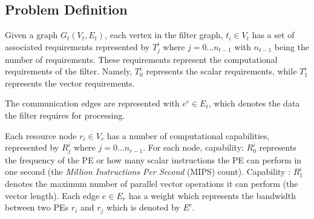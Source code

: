 \documentclass[10pt, conference, compsocconf, reqno]{IEEEtran}
\begin{document}
\subsection{Problem Definition}

Given a graph $G_t(V_t, E_t)$, each vertex in the filter graph, $t_i \in
V_t$ has a set of associated requirements represented by $T^{i}_{j}$
where $j=0...n_{t-1}$ with $n_{t-1}$ being the number of
requirements. These requirements represent the computational
requirements of the filter. Namely, $T^i_0$ represents the scalar
requirements, while $T^i_1$ represents the vector requirements.


The communication edges are represented with \mbox{$e^c \in E_t$}, which
denotes the data the filter requires for processing.



Each resource node $r_i \in V_r$ has a number of computational
capabilities, represented by $R^{i}_{j}$ where $j=0...n_{r-1}$.
For each node, capability: $R^i_0$ represents the frequency of the PE or
how many scalar instructions the PE can perform in one second (the
\textit{Million Instructions Per Second} (MIPS) count). Capability :
$R^i_1$ denotes the maximum number of parallel vector operations it can
perform (the vector length). Each edge $e \in E_r$ has a weight which
represents the bandwidth between two PEs $r_i$ and $r_j$ which is
denoted by $E^c$.
\end{document}
